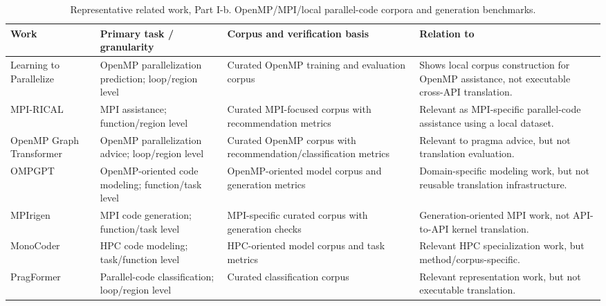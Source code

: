 \begin{table}[p]
\centering
\caption{
Representative related work, Part I-b. OpenMP/MPI/local parallel-code corpora and generation benchmarks.
}
\label{tab:related-work-b}
\scriptsize
\setlength{\tabcolsep}{3.2pt}
\renewcommand{\arraystretch}{1.05}
\begin{tabularx}{\textwidth}{@{}
>{\RaggedRight\arraybackslash}p{}
>{\RaggedRight\arraybackslash}p{}
>{\RaggedRight\arraybackslash}p{}
>{\RaggedRight\arraybackslash}X
@{}}
\toprule
Work & Primary task / granularity & Corpus and verification basis & Relation to \parbench{} \\
\midrule

Learning to Parallelize~\cite{LearningToParallelize2023}
& OpenMP parallelization prediction; loop/region level
& Curated OpenMP training and evaluation corpus
& Shows local corpus construction for OpenMP assistance, not executable cross-API translation. \\

MPI-RICAL~\cite{MPIRICAL2023}
& MPI assistance; function/region level
& Curated MPI-focused corpus with recommendation metrics
& Relevant as MPI-specific parallel-code assistance using a local dataset. \\

OpenMP Graph Transformer~\cite{OpenMPGraphTransformer2023}
& OpenMP parallelization advice; loop/region level
& Curated OpenMP corpus with recommendation/classification metrics
& Relevant to pragma advice, but not translation evaluation. \\

OMPGPT~\cite{OMPGPT2024}
& OpenMP-oriented code modeling; function/task level
& OpenMP-oriented model corpus and generation metrics
& Domain-specific modeling work, but not reusable translation infrastructure. \\

MPIrigen~\cite{MPIrigen2024}
& MPI code generation; function/task level
& MPI-specific curated corpus with generation checks
& Generation-oriented MPI work, not API-to-API kernel translation. \\

MonoCoder~\cite{MonoCoder2024}
& HPC code modeling; task/function level
& HPC-oriented model corpus and task metrics
& Relevant HPC specialization work, but method/corpus-specific. \\

PragFormer~\cite{PragFormer2025}
& Parallel-code classification; loop/region level
& Curated classification corpus
& Relevant representation work, but not executable translation. \\


\end{tabularx}
\end{table}
